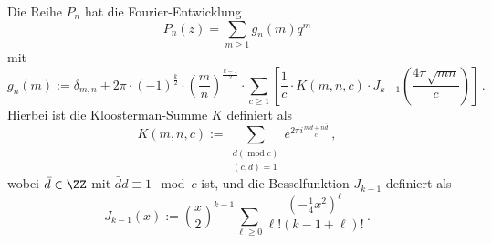 \begin{satz}
Die Reihe $P_n$ hat die Fourier-Entwicklung
\[
	P_n(z) = \sum_{m \geq 1} g_n(m) q^m
\]
mit
\[
	g_n(m) := \delta_{m,n} + 2\pi \cdot (-1)^{\frac k2} \cdot \left(\frac mn\right)^{\frac {k-1}2} \cdot \sum_{c \geq 1} \left[ \frac 1c \cdot K(m,n,c) \cdot J_{k-1}\left(\frac{4\pi \sqrt{mn}}c\right) \right]
	\,.
\]
Hierbei ist die Kloosterman-Summe $K$ definiert als
\[
	K(m,n,c) := \sum_{\substack{d (\operatorname{mod} c) \\ (c,d)=1}} e^{2\pi i \frac{md + n\bar{d}}{c}}
	\,,
\]
wobei $\bar d \in \ZZ$ mit $\bar d d \equiv 1 \mod c$ ist, und die Besselfunktion $J_{k-1}$ definiert als
\[
	J_{k-1}(x) := \left(\frac x2\right)^{k-1} \sum_{\ell \geq 0} \frac{(-\frac 14 x^2)^\ell}{\ell! (k-1+\ell)!}
	\,.
\]
\end{satz}

